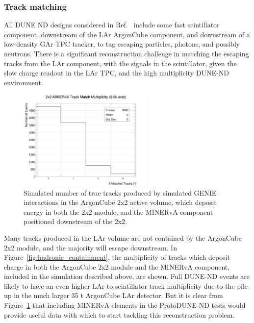 \subsubsection{Track matching}
All DUNE ND designs considered in Ref.~\cite{dune_ndcsg} include some fast scintillator component, downstream of the LAr ArgonCube component, and downstream of a low-density GAr TPC tracker, to tag escaping particles, photons, and possibly neutrons. There is a significant reconstruction challenge in matching the escaping tracks from the LAr component, with the signals in the scintillator, given the slow charge readout in the LAr TPC, and the high multiplicity DUNE-ND environment.

\begin{figure}[htb]
  \centering
  \includegraphics[width=0.6\textwidth]{plots/2x2_minerva_plots/track_mathch_multiplicity.png}
  \caption{Simulated number of true tracks produced by simulated GENIE interactions in the ArgonCube 2x2 active volume, which deposit energy in both the 2x2 module, and the MINERvA component positioned downstream of the 2x2.}
  \label{fig:track_multiplicity}
\end{figure}
Many tracks produced in the LAr volume are not contained by the ArgonCube 2x2 module, and the majority will escape downstream. In Figure~\ref{fig:hadronic_containment}, the multiplicity of tracks which deposit charge in both the ArgonCube 2x2 module and the MINERvA component, included in the simulation described above, are shown. Full DUNE-ND events are likely to have an even higher LAr to scintillator track multiplicity due to the pile-up in the much larger 35 t ArgonCube LAr detector. But it is clear from Figure~\ref{fig:track_multiplicity} that including MINERvA elements in the ProtoDUNE-ND tests would provide useful data with which to start tackling this reconstruction problem.

